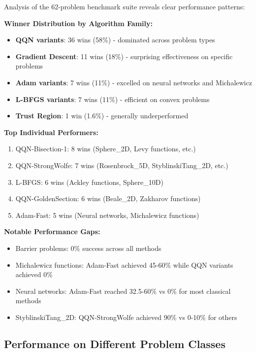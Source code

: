 Analysis of the 62-problem benchmark suite reveals clear performance patterns:

\textbf{Winner Distribution by Algorithm Family:}

\begin{itemize}
\tightlist
\item
  \textbf{QQN variants}: 36 wins (58\%) - dominated across problem types
\item
  \textbf{Gradient Descent}: 11 wins (18\%) - surprising effectiveness on specific problems
\item
  \textbf{Adam variants}: 7 wins (11\%) - excelled on neural networks and Michalewicz
\item
  \textbf{L-BFGS variants}: 7 wins (11\%) - efficient on convex problems
\item
  \textbf{Trust Region}: 1 win (1.6\%) - generally underperformed
\end{itemize}

\textbf{Top Individual Performers:}

\begin{enumerate}
\def\labelenumi{\arabic{enumi}.}
\tightlist
\item
  QQN-Bisection-1: 8 wins (Sphere\_2D, Levy functions, etc.)
\item
  QQN-StrongWolfe: 7 wins (Rosenbrock\_5D, StyblinskiTang\_2D, etc.)
\item
  L-BFGS: 6 wins (Ackley functions, Sphere\_10D)
\item
  QQN-GoldenSection: 6 wins (Beale\_2D, Zakharov functions)
\item
  Adam-Fast: 5 wins (Neural networks, Michalewicz functions)
\end{enumerate}

\textbf{Notable Performance Gaps:}

\begin{itemize}
\tightlist
\item
  Barrier problems: 0\% success across all methods
\item
  Michalewicz functions: Adam-Fast achieved 45-60\% while QQN variants achieved 0\%
\item
  Neural networks: Adam-Fast reached 32.5-60\% vs 0\% for most classical methods
\item
  StyblinskiTang\_2D: QQN-StrongWolfe achieved 90\% vs 0-10\% for others
\end{itemize}

\hypertarget{performance-on-different-problem-classes}{%
\subsection{Performance on Different Problem Classes}\label{performance-on-different-problem-classes}}

